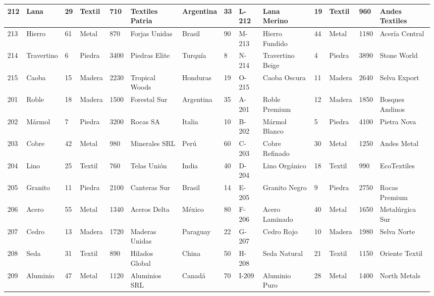 \begin{minipage}[c][\textheight][c]{\dimexpr\textwidth+\marginparsep+\marginparwidth\relax}
{\begin{minipage}[c]{\linewidth}
{\begin{tabular}{@{}llllllllllllll@{}}
    \midrule
    212 & Lana & 29 & Textil & 710 & Textiles Patria & Argentina & 33 & L-212 & Lana Merino & 19 & Textil & 960 & Andes Textiles \\
    \midrule
    213 & Hierro & 61 & Metal & 870 & Forjas Unidas & Brasil & 90 & M-213 & Hierro Fundido & 44 & Metal & 1180 & Acería Central \\
    \midrule
    214 & Travertino & 6 & Piedra & 3400 & Piedras Elite & Turquía & 8 & N-214 & Travertino Beige & 4 & Piedra & 3890 & Stone World \\
    \midrule
    215 & Caoba & 15 & Madera & 2230 & Tropical Woods & Honduras & 19 & O-215 & Caoba Oscura & 11 & Madera & 2640 & Selva Export \\
    \midrule
    201 & Roble & 18 & Madera & 1500 & Forestal Sur & Argentina & 35 & A-201 & Roble Premium & 12 & Madera & 1850 & Bosques Andinos \\
    \midrule
    202 & Mármol & 7 & Piedra & 3200 & Rocas SA & Italia & 10 & B-202 & Mármol Blanco & 5 & Piedra & 4100 & Pietra Nova \\
    \midrule
    203 & Cobre & 42 & Metal & 980 & Minerales SRL & Perú & 60 & C-203 & Cobre Refinado & 30 & Metal & 1250 & Andes Metal \\
    \midrule
    204 & Lino & 25 & Textil & 760 & Telas Unión & India & 40 & D-204 & Lino Orgánico & 18 & Textil & 990 & EcoTextiles \\
    \midrule
    205 & Granito & 11 & Piedra & 2100 & Canteras Sur & Brasil & 14 & E-205 & Granito Negro & 9 & Piedra & 2750 & Rocas Premium \\
    \midrule
    206 & Acero & 55 & Metal & 1340 & Aceros Delta & México & 80 & F-206 & Acero Laminado & 40 & Metal & 1650 & Metalúrgica Sur \\
    \midrule
    207 & Cedro & 13 & Madera & 1720 & Maderas Unidas & Paraguay & 22 & G-207 & Cedro Rojo & 10 & Madera & 1980 & Selva Norte \\
    \midrule
    208 & Seda & 31 & Textil & 890 & Hilados Global & China & 50 & H-208 & Seda Natural & 21 & Textil & 1150 & Oriente Textil \\
    \midrule
    209 & Aluminio & 47 & Metal & 1120 & Aluminios SRL & Canadá & 70 & I-209 & Aluminio Puro & 28 & Metal & 1400 & North Metals \\
    \bottomrule
  \end{tabular}
  }%
  \label{tbl-rotado}
  \vspace{\intextsep}
  \end{minipage}%
}%
\end{minipage}%
\clearpage

